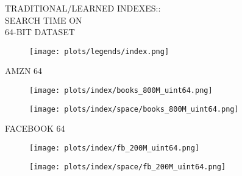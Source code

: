 \documentclass{article}
\begin{document}
\begin{figure}[!htbp]
\fbox
{
\begin{minipage}[t][0.98\textheight][t]{\textwidth}
\centering
    \begin{minipage}{0.23\linewidth}
    \footnotesize{TRADITIONAL/LEARNED INDEXES::\\SEARCH TIME ON \\ 64-BIT DATASET}
    \end{minipage}
   \begin{minipage}{0.7\linewidth}
        \begin{figure}[H]
        \texttt{[image: plots/legends/index.png]}
        \end{figure}
    \end{minipage}
    \vspace*{-10px}

    \begin{minipage}{0.05\linewidth}
    \begin{sideways}\small AMZN 64 \end{sideways}
    \end{minipage}
    \begin{minipage}{0.32\linewidth}
        \begin{figure}[H]
        \texttt{[image: plots/index/books\_800M\_uint64.png]}
        \end{figure}
    \end{minipage}
    \begin{minipage}{0.32\linewidth}
        \begin{figure}[H]
            \texttt{[image: plots/index/space/books\_800M\_uint64.png]}
        \end{figure}
    \end{minipage}
    \vspace*{-15px}

    \begin{minipage}{0.05\linewidth}
    \begin{sideways}\small FACEBOOK 64\end{sideways}
    \end{minipage}
    \begin{minipage}{0.32\linewidth}
        \begin{figure}[H]
        \texttt{[image: plots/index/fb\_200M\_uint64.png]}
        \end{figure}
    \end{minipage}
    \begin{minipage}{0.32\linewidth}
        \begin{figure}[H]
            \texttt{[image: plots/index/space/fb\_200M\_uint64.png]}
        \end{figure}
    \end{minipage}
    \vspace*{-15px}


\end{minipage}}
\end{figure}
\end{document}
